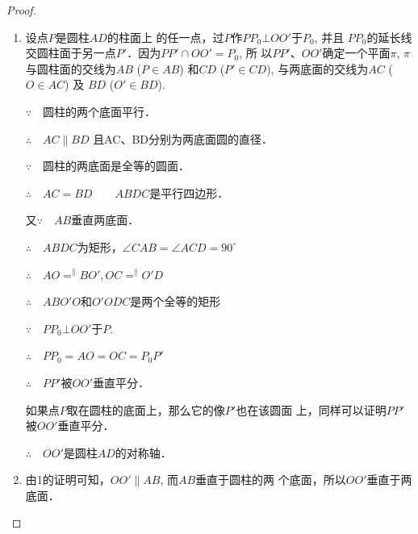 \begin{figure}[htp]
    \centering
{}
    \caption{}
\end{figure}


\begin{proof}
\begin{enumerate}
    \item 

设点$P$是圆柱$AD$的柱面上
的任一点，过$P$作$PP_0\bot OO'$于$P_0$, 并且
$PP_0$的延长线交圆柱面于另一点$P'$．因为$PP'\cap OO'=P_0$, 所
以$PP'$、$OO'$确定一个平面$\pi$, $\pi$与圆柱面的交线为$AB$ ($P\in
AB$) 和$CD$ ($P'\in CD$), 与两底面的交线为$AC$ ($O\in AC$) 及
$BD$ ($O'\in BD$).

$\because\quad $圆柱的两个底面平行．

$\therefore\quad AC\parallel BD$ 且AC、BD分别为两底面圆的直径．

$\because\quad $圆柱的两底面是全等的圆面．

$\therefore\quad AC=BD\qquad ABDC$是平行四边形．

又$\because\quad AB$垂直两底面．

$\therefore\quad ABDC$为矩形，$\angle CAB=\angle ACD=90^{\circ}$

$\therefore\quad AO\displaystyle\mathop{=}^{\parallel}BO', OC\displaystyle\mathop{=}^{\parallel}O'D$

$\therefore\quad ABO'O$和$O'ODC$是两个全等的矩形

$\because\quad PP_0\bot OO'$于$P$.

$\therefore\quad PP_0=AO=OC=P_0P'$

$\therefore\quad PP'$被$OO'$垂直平分．

如果点$P$取在圆柱的底面上，那么它的像$P'$也在该圆面
上，同样可以证明$PP'$被$OO'$垂直平分．

$\therefore\quad OO'$是圆柱$AD$的对称轴．

\item 由1的证明可知，$OO'\parallel AB$, 而$AB$垂直于圆柱的两
个底面，所以$OO'$垂直于两底面．
\end{enumerate}
\end{proof}

